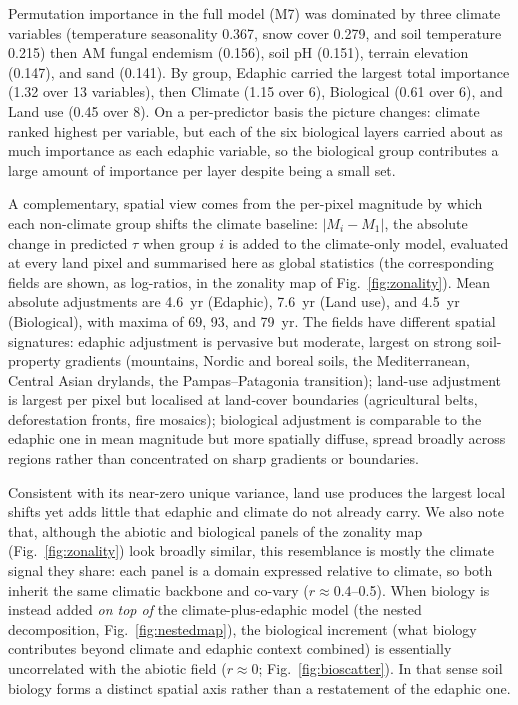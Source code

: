 \documentclass[12pt, a4paper]{article}
\begin{document}
Permutation importance in the full model (M7) was dominated by three climate
variables (temperature seasonality 0.367, snow cover 0.279, and soil
temperature 0.215) then AM fungal endemism (0.156), soil pH (0.151), terrain
elevation (0.147), and sand (0.141). By group, Edaphic carried the largest total
importance (1.32 over 13 variables), then Climate (1.15 over 6), Biological (0.61
over 6), and Land use (0.45 over 8). On a per-predictor basis the picture
changes: climate ranked highest per variable, but each of the six biological
layers carried about as much importance as each edaphic variable, so the
biological group contributes a large amount of importance per layer despite
being a small set.

A complementary, spatial view comes from the per-pixel magnitude by which each
non-climate group shifts the climate baseline: $|M_i - M_1|$, the absolute change
in predicted $\tau$ when group $i$ is added to the climate-only model, evaluated
at every land pixel and summarised here as global statistics (the corresponding
fields are shown, as log-ratios, in the zonality map of Fig.~\ref{fig:zonality}).
Mean absolute adjustments are 4.6~yr (Edaphic),
7.6~yr (Land use), and 4.5~yr (Biological), with maxima of 69, 93, and 79~yr. The fields
have different spatial signatures: edaphic adjustment is pervasive but moderate, largest
on strong soil-property gradients (mountains, Nordic and boreal soils, the Mediterranean,
Central Asian drylands, the Pampas--Patagonia transition); land-use adjustment is largest
per pixel but localised at land-cover boundaries (agricultural belts, deforestation
fronts, fire mosaics); biological adjustment is comparable to the edaphic one in mean
magnitude but more spatially diffuse, spread broadly across regions rather than
concentrated on sharp gradients or boundaries.

Consistent with its near-zero unique variance, land use produces the largest local shifts yet adds little that edaphic and climate do not already carry. We also note that, although the abiotic and biological panels of the zonality map (Fig.~\ref{fig:zonality}) look broadly similar, this resemblance is mostly the climate signal they share: each panel is a domain expressed relative to climate, so both inherit the same climatic backbone and co-vary ($r\approx0.4$--0.5). When biology is instead added \emph{on top of} the climate-plus-edaphic model (the nested decomposition, Fig.~\ref{fig:nestedmap}), the biological increment (what biology contributes beyond climate and edaphic context combined) is essentially uncorrelated with the abiotic field ($r\approx0$; Fig.~\ref{fig:bioscatter}). In that sense soil biology forms a distinct spatial axis rather than a restatement of the edaphic one.
\end{document}
